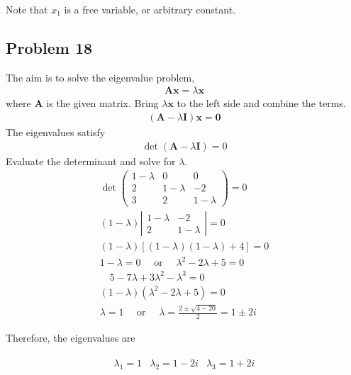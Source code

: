 \documentclass[12pt]{article}
\begin{document}
Note that \(x_{1}\) is a free variable, or arbitrary constant.
\subsection*{Problem 18}
\label{sec:org6bc6daf}
   The aim is to solve the eigenvalue problem,
\begin{align*}
\mathbf{A} \mathbf{x}=\lambda \mathbf{x}
\end{align*}
where \(\mathbf{A}\) is the given matrix. Bring \(\lambda \mathbf{x}\) to the left side and combine the terms.
\begin{align*}
(\mathbf{A}-\lambda \mathbf{I}) \mathbf{x}=\mathbf{0}
\end{align*}
The eigenvalues satisfy
\begin{align*}
\operatorname{det}(\mathbf{A}-\lambda \mathbf{I})=0
\end{align*}
Evaluate the determinant and solve for \(\lambda\).
\begin{equation*}
	\begin{array}{c}
		\operatorname{det}\left(\begin{array}{ccc}
				1-\lambda & 0         & 0         \\
				2         & 1-\lambda & -2        \\
				3         & 2         & 1-\lambda
			\end{array}\right)=0     \\
		(1-\lambda)\left|\begin{array}{cc}
			1-\lambda & -2        \\
			2         & 1-\lambda
		\end{array}\right|=0            \\
		(1-\lambda)[(1-\lambda)(1-\lambda)+4]=0                        \\
		1-\lambda=0 \quad \text { or } \quad \lambda^{2}-2 \lambda+5=0 \\
		\quad 5-7 \lambda+3 \lambda^{2}-\lambda^{3}=0                  \\
		(1-\lambda)\left(\lambda^{2}-2 \lambda+5\right)=0              \\
		\lambda=1 \quad \text { or } \quad \lambda=\frac{2 \pm \sqrt{4-20}}{2}=1 \pm 2 i
	\end{array}
\end{equation*}

Therefore, the eigenvalues are

\begin{align*}
\begin{array}{|l|l|l|l|}
\hline \lambda_{1}=1 & \lambda_{2}=1-2 i & \lambda_{3}=1+2 i
\end{array}
\end{align*}
\end{document}
